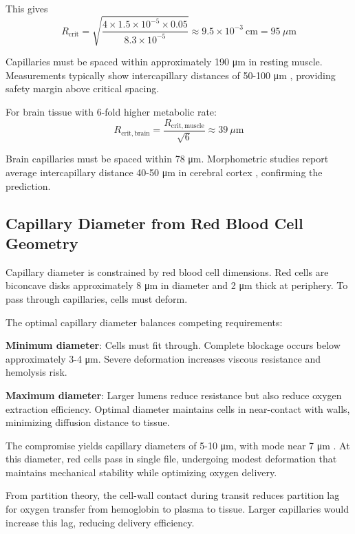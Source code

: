 \documentclass[12pt,a4paper]{article}
\theoremstyle{remark}
\begin{document}
This gives
\begin{equation}
R_{\mathrm{crit}} = \sqrt{\frac{4 \times 1.5 \times 10^{-5} \times 0.05}{8.3 \times 10^{-5}}} \approx 9.5 \times 10^{-3}~\mathrm{cm} = 95~\mu\mathrm{m}
\end{equation}

Capillaries must be spaced within approximately 190 μm in resting muscle. Measurements typically show intercapillary distances of 50-100 μm \cite{hudlicka1992muscle}, providing safety margin above critical spacing.

For brain tissue with 6-fold higher metabolic rate:
\begin{equation}
R_{\mathrm{crit,brain}} = \frac{R_{\mathrm{crit,muscle}}}{\sqrt{6}} \approx 39~\mu\mathrm{m}
\end{equation}

Brain capillaries must be spaced within 78 μm. Morphometric studies report average intercapillary distance 40-50 μm in cerebral cortex \cite{pawlik1981quantitative}, confirming the prediction.

\subsection{Capillary Diameter from Red Blood Cell Geometry}

Capillary diameter is constrained by red blood cell dimensions. Red cells are biconcave disks approximately 8 μm in diameter and 2 μm thick at periphery. To pass through capillaries, cells must deform.

The optimal capillary diameter balances competing requirements:

\textbf{Minimum diameter}: Cells must fit through. Complete blockage occurs below approximately 3-4 μm. Severe deformation increases viscous resistance and hemolysis risk.

\textbf{Maximum diameter}: Larger lumens reduce resistance but also reduce oxygen extraction efficiency. Optimal diameter maintains cells in near-contact with walls, minimizing diffusion distance to tissue.

The compromise yields capillary diameters of 5-10 μm, with mode near 7 μm \cite{zweifach1973morphometric}. At this diameter, red cells pass in single file, undergoing modest deformation that maintains mechanical stability while optimizing oxygen delivery.

From partition theory, the cell-wall contact during transit reduces partition lag for oxygen transfer from hemoglobin to plasma to tissue. Larger capillaries would increase this lag, reducing delivery efficiency.
\end{document}
